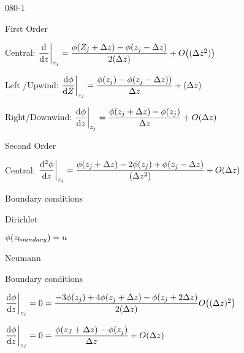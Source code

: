 \begin{mitframe}{080-1}
 \begin{listone}
\item First Order
	\begin{listtwo}
		\item Central: $\dfrac{\mathrm{d}}{\mathrm{d}z}\bigg|_{z_j}=\dfrac{\eleccoeff(Z_j+\iipf{z})-\eleccoeff(z_j-\iipf{z})}{2(\iipf{z})}+O\big((\iipf{z}^2)\big)$
        \item Left /Upwind: $\dfrac{\mathrm{d}\eleccoeff}{\mathrm{d}Z}\bigg|_{z_j}=\dfrac{\eleccoeff(z_j)-\eleccoeff(z_j-\iipf{z}))}{\iipf{z}}+(\iipf{z})$
        \item Right/Downwind: $\dfrac{\mathrm{d}\eleccoeff}{\mathrm{d}z}\bigg|_{z_j}=\dfrac{\eleccoeff(z_j+\iipf{z})-\eleccoeff(z_j)}{\iipf{z}}+O(\iipf{z})$
\end{listtwo}
\item Second Order
	\begin{listtwo}
    	\item Central: $\dfrac{\mathrm{d^2}\eleccoeff}{\mathrm{d}z}\bigg|_{z_j}=\dfrac{\eleccoeff(z_j+\iipf{z})-2\eleccoeff(z_j)+\eleccoeff(z_j-\iipf{z})}{(\iipf{z}^2)}+O(\iipf{z})$
    \end{listtwo}
	\item Boundary conditions
    	\begin{listtwo}
        	\item Dirichlet
            	\begin{listthree}
                	\item $\eleccoeff(z_{boundary})=\forcepot$
                \end{listthree}
            \item Neumann
        \end{listtwo}
\item Boundary conditions
		\begin{listtwo}
        	\item $\dfrac{\mathrm{d}\eleccoeff}{\mathrm{d}z}\bigg|_{z_j}=0=\dfrac{-3\eleccoeff(z_j)+4\eleccoeff(z_j+\iipf{z})-\eleccoeff(z_j+2\iipf{z})}{2(\iipf{z})}O\big((\iipf{z})^2\big)$
            \item $\dfrac{\mathrm{d}\eleccoeff}{\mathrm{d}z}\bigg|_{z_j}=0=\dfrac{\eleccoeff(z_J+\iipf{z})-\eleccoeff(z_j)}{\iipf{z}}+O(\iipf{z})$
            
        \end{listtwo}
\end{listone}   
\end{mitframe}